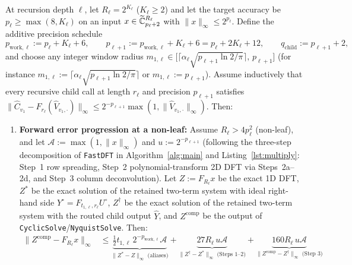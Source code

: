 \begin{lemma}\label{lem:forward}
At recursion depth $\ell$, let $R_\ell = 2^{K_\ell}$ ($K_\ell \ge 2$) and let the target accuracy be $p_\ell \ge \max(8, K_\ell)$ on an input $x \in \widetilde{\mathbb{C}}_{p_\ell+2}^{R_\ell}$ with $\|x\|_\infty \le 2^{p_\ell}$. Define the additive precision schedule
\begin{equation}\label{eq:cert-sched}
  p_{\mathrm{work},\ell} := p_\ell + K_\ell + 6, \qquad p_{\ell+1} := p_{\mathrm{work},\ell} + K_\ell + 6 = p_\ell + 2 K_\ell + 12, \qquad q_{\mathrm{child}} := p_{\ell+1} + 2,
\end{equation}
and choose any integer window radius $m_{1,\ell} \in \bigl[\lceil \alpha_\ell\sqrt{p_{\ell+1}\ln 2 / \pi} \rceil, \, p_{\ell+1}\bigr]$ (for instance $m_{1,\ell} := \lceil \alpha_\ell\sqrt{p_{\ell+1}\ln 2 / \pi} \rceil$ or $m_{1,\ell} := p_{\ell+1}$). Assume inductively that every recursive child call at length $r_\ell$ and precision $p_{\ell+1}$ satisfies $\|\widehat{C}_{v_1} - F_{r_\ell}(\widehat{V}_{v_1, \cdot})\|_\infty \le 2^{-p_{\ell+1}}\max(1, \|\widehat{V}_{v_1, \cdot}\|_\infty)$. Then:
\begin{enumerate}[label=\textbf{\arabic*.},leftmargin=*]
  \item \textbf{Forward error progression at a non-leaf:} Assume $R_\ell > 4 p_\ell^2$ (non-leaf), and let $\mathcal{A} := \max(1, \|x\|_\infty)$ and $u := 2^{-p_{\ell+1}}$ (following the three-step decomposition of \texttt{FastDFT} in Algorithm~\ref{alg:main} and Listing~\ref{lst:multiply}: Step~1 row spreading, Step~2 polynomial-transform 2D DFT via Steps~2a--2d, and Step~3 column deconvolution). Let $Z := F_{R_\ell} x$ be the exact 1D DFT, $Z^*$ be the exact solution of the retained two-term system with ideal right-hand side $Y^\circ = F_{t_{1,\ell}, r_\ell} U^\circ$, $Z^\dagger$ be the exact solution of the retained two-term system with the routed child output $\widehat{Y}$, and $Z^{\mathrm{comp}}$ be the output of \texttt{CyclicSolve}/\texttt{NyquistSolve}. Then:
  \begin{equation}\label{eq:forward-split}
    \begin{aligned}
      \|Z^{\mathrm{comp}} - F_{R_\ell} x\|_\infty
      &\le \underbrace{\frac{1}{2} t_{1,\ell} \, 2^{-p_{\mathrm{work},\ell}} \mathcal{A}}_{\|Z^* - Z\|_\infty \text{ (aliases)}} + \underbrace{27 R_\ell \, u \mathcal{A}}_{\|Z^\dagger - Z^*\|_\infty \text{ (Steps 1--2)}} + \underbrace{160 R_\ell \, u \mathcal{A}}_{\|Z^{\mathrm{comp}} - Z^\dagger\|_\infty \text{ (Step 3)}} \\

\end{aligned}
\end{equation}
\end{enumerate}
\end{lemma}
